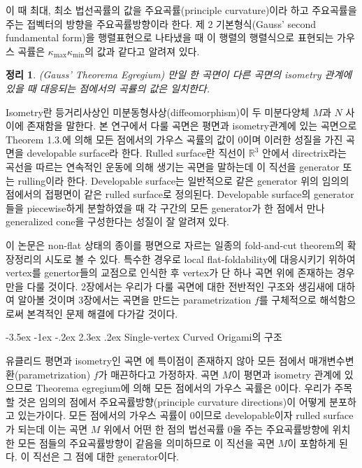 \documentclass[11pt]{article}
\makeatletter
\renewcommand\section{\@startsection {section}{1}{\z@}%
                                   {-3.5ex \@plus -1ex \@minus -.2ex}%
                                   {2.3ex \@plus.2ex}%
                                   {\normalfont\large\sffamily\bfseries}}
\newtheorem{theorem}{정리}
\makeatother
\begin{document}
이 때 최대, 최소 법선곡률의 값을 주요곡률(principle curvature)이라 하고 주요곡률을 주는 접벡터의 방향을 주요곡률방향이라 한다. 제 2 기본형식(Gauss' second fundamental form)을 행렬표현으로 나타냈을 때 이 행렬의 행렬식으로 표현되는 가우스 곡률은 $\kappa_{\max} \kappa_{\min}$의 값과 같다고 알려져 있다.


\begin{theorem}
(Gauss' Theorema Egregium) 만일 한 곡면이 다른 곡면의 isometry 관계에 있을 때 대응되는 점에서의 곡률의 값은 일치한다.
\end{theorem}


Isometry란 등거리사상인 미분동형사상(diffeomorphism)이 두 미분다양체 $M$과 $N$ 사이에 존재함을 말한다. 본 연구에서 다룰 곡면은 평면과 isometry관계에 있는 곡면으로 Theorem 1.3.에 의해 모든 점에서의 가우스 곡률의 값이 0이며 이러한 성질을 가진 곡면을 developable surface라 한다.
Rulled surface란 직선이 ${\mathbb R}^3$ 안에서 directrix라는 곡선을 따르는 연속적인 운동에 의해 생기는 곡면을 말하는데 이 직선을 generator 또는 rulling이라 한다. Developable surface는 일반적으로 같은 generator 위의 임의의 점에서의 접평면이 같은 rulled surface로 정의된다. Developable surface의 generator들을 piecewise하게 분할하였을 때 각 구간의 모든 generator가 한 점에서 만나 generalized cone을 구성한다는 성질이 잘 알려져 있다. \cite{6}

이 논문은 non-flat 상태의 종이를 평면으로 자르는 일종의 fold-and-cut theorem의 확장정리의 시도로 볼 수 있다. 특수한 경우로 local flat-foldability에 대응시키기 위하여 vertex를 genertor들의 교점으로 인식한 후 vertex가 단 하나 곡면 위에 존재하는 경우만을 다룰 것이다.
2장에서는 우리가 다룰 곡면에 대한 전반적인 구조와 생김새에 대하여 알아볼 것이며 3장에서는 곡면을 만드는 parametrization $f$를 구체적으로 해석함으로써 본격적인 문제 해결에 다가갈 것이다.
 



\section{Single-vertex Curved Origami의 구조} 

유클리드 평면과 isometry인 곡면 에 특이점이 존재하지 않아 모든 점에서 매개변수변환(parametrization) $f$가 매끈하다고 가정하자. 곡면 $M$이 평면과 isometry 관계에 있으므로 Theorema egregium에 의해 모든 점에서의 가우스 곡률은 0이다. 우리가 주목할 것은 임의의 점에서 주요곡률방향(principle curvature directions)이 어떻게 분포하고 있는가이다. 모든 점에서의 가우스 곡률이 0이므로 developable이자 rulled surface가 되는데 이는 곡면 $M$ 위에서 어떤 한 점의 법선곡률 0을 주는 주요곡률방향에 위치한 모든 점들의 주요곡률방향이 같음을 의미하므로 이 직선을 곡면 $M$이 포함하게 된다. 이 직선은 그 점에 대한 generator이다.
\end{document}
